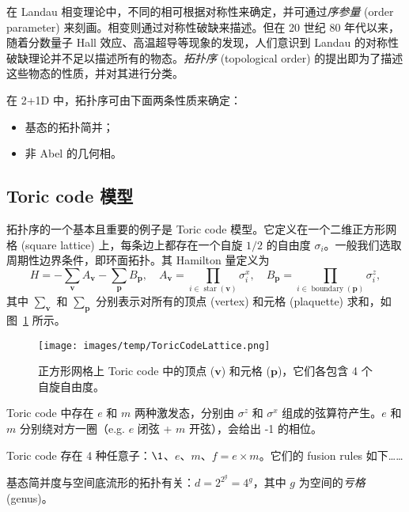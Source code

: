 在 Landau 相变理论中，不同的相可根据对称性来确定，并可通过\emph{序参量} (order parameter) 来刻画。相变则通过对称性破缺来描述。但在 20 世纪 80 年代以来，随着分数量子 Hall 效应、高温超导等现象的发现，人们意识到 Landau 的对称性破缺理论并不足以描述所有的物态。\emph{拓扑序} (topological order) 的提出即为了描述这些物态的性质，并对其进行分类。

在 2+1D 中，拓扑序可由下面两条性质来确定\cite{zeng2019introduction}：
\begin{itemize}
  \item 基态的拓扑简并；
  \item 非 Abel 的几何相。
\end{itemize}

\subsection{Toric code 模型}

拓扑序的一个基本且重要的例子是 Toric code 模型\cite{kitaev2003fault}。它定义在一个二维正方形网格 (square lattice) 上，每条边上都存在一个自旋 $1/2$ 的自由度 $\sigma_i$。一般我们选取周期性边界条件，即环面拓扑。其 Hamilton 量定义为
\begin{equation}
  H = -\sum_\bm{v} A_\bm{v} - \sum_\bm{p} B_\bm{p}, \quad
  A_\bm{v} = \prod_{i\in\operatorname{star}(\bm{v})} \sigma_i^x, \quad
  B_\bm{p} = \prod_{i\in\operatorname{boundary}(\bm{p})} \sigma_i^z,
  \label{eq:toric-code-hamiltonian}
\end{equation}
其中 $\sum_\bm{v}$ 和 $\sum_\bm{p}$ 分别表示对所有的顶点 (vertex) 和元格 (plaquette) 求和，如图~\ref{fig:toric-code-vertex-plaquette} 所示。

\begin{figure}[htb]
  \centering
  \texttt{[image: images/temp/ToricCodeLattice.png]}
  \caption[Toric code 中的顶点和元格]{正方形网格上 Toric code 中的顶点 ($\bm{v}$) 和元格 ($\bm{p}$)，它们各包含 4 个自旋自由度。}
  \label{fig:toric-code-vertex-plaquette}
\end{figure}

Toric code 中存在 $e$ 和 $m$ 两种激发态，分别由 $\sigma^z$ 和 $\sigma^x$ 组成的弦算符产生。$e$ 和 $m$ 分别绕对方一圈（e.g. $e$ 闭弦 + $m$ 开弦），会给出 -1 的相位。

Toric code 存在 4 种任意子：$\1$、$e$、$m$、$f=e\times m$。它们的 fusion rules 如下……

基态简并度与空间底流形的拓扑有关：$d=2^{2^g}=4^g$，其中 $g$ 为空间的\emph{亏格} (genus)。

